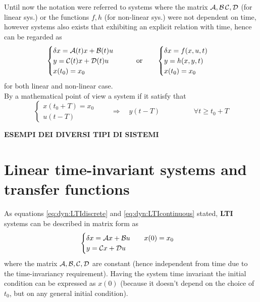 	Until now the notation were referred to  systems where the matrix $\mathcal{A},\mathcal{B}\,\mathcal{C},\mathcal{D}$ (for linear sys.) or the functions $f,h$ (for non-linear sys.) were not dependent on time, however  systems also exists that exhibiting an explicit relation with time, hence can be regarded as
	\begin{equation}
		\begin{cases}
			\delta x = \mathcal{A}(t) x + \mathcal{B}(t) u \\ y = \mathcal{C}(t) x + \mathcal{D}(t) u \\ x(t_0) = x_0
		\end{cases}
		\qquad \textrm{or} \qquad 
		\begin{cases}
			\delta x = f(x,u,t) \\
			y = h(x,y,t) \\
			x(t_0) = x_0
		\end{cases}
	\end{equation}
	for both linear and non-linear case.\\
	By a mathematical point of view a system if it satisfy that
	\[ \begin{cases}
		x(t_0 + T) = x_0 \\ u(t-T) 
	\end{cases} \qquad \Rightarrow \quad y(t-T) \hspace{2cm} \forall t \geq t_0 + T \]
	
	\textbf{ESEMPI DEI DIVERSI TIPI DI SISTEMI}
	
\section{Linear time-invariant systems and transfer functions}
	As equations \ref{eq:dyn:LTIdiscrete} and \ref{eq:dyn:LTIcontinuous} stated,  \textbf{LTI} systems can be described in matrix form as
	\[ \begin{cases}
		\delta x = \mathcal{A} x + \mathcal{B} u \qquad x(0) = x_0\\ y = \mathcal{C} x + \mathcal{D} u 
	\end{cases} \]
	where the matrix $\mathcal{A},\mathcal{B},\mathcal{C},\mathcal{D}$ are constant (hence independent from time due to the time-invariancy requirement). Having the system time invariant the initial condition can be expressed as $x(0)$ (because it doesn't depend on the choice of $t_0$, but on any general initial condition).
	
